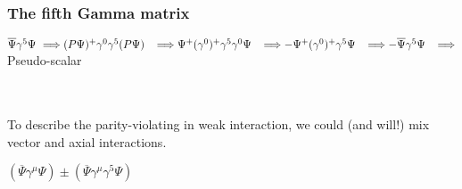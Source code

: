 \begin{frame}\frametitle{The fifth Gamma matrix}



$\overline{\Psi} \gamma^5 \Psi  \, \, \Longrightarrow (P\Psi)^{+} \gamma^0 \gamma^5  (P\Psi) \\  \, \, \, \, \,  \Longrightarrow \Psi^{+} (\gamma^0 )^{+} \gamma^5 \gamma^0 \Psi \\  \, \, \, \, \,  \Longrightarrow - \Psi^{+}  (\gamma^0 )^{+}  \gamma^5  \Psi \\  \, \, \, \, \, \Longrightarrow  - \overline{\Psi} \gamma^5 \Psi \\  \, \, \, \, \, \Longrightarrow $ Pseudo-scalar 
  

\\\\

{\color{red} To describe the parity-violating in weak interaction, we could (and will!) mix vector and axial interactions.}

\begin{center}
$(\overline{\Psi}  \gamma^\mu \Psi) \pm (\overline{\Psi}  \gamma^\mu \gamma^5 \Psi)$\end{center}




\end{frame}
